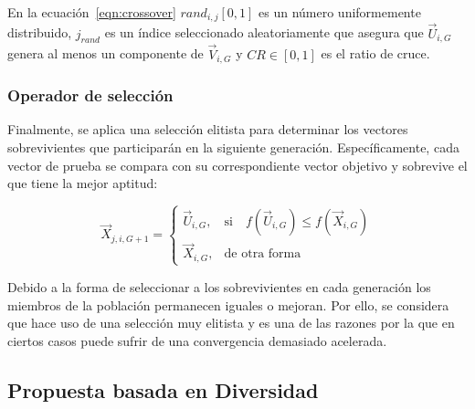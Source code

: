 En la ecuación~\ref{eqn:crossover} $rand_{i,j}[0,1]$ es un número uniformemente distribuido, 
$j_{rand}$ es un índice seleccionado aleatoriamente que asegura que $\vec{U}_{i,G}$ genera al menos un componente 
de $\vec{V}_{i,G}$ y $CR \in [0,1]$ es el ratio de cruce.

\subsubsection{Operador de selección}
Finalmente, se aplica una selección elitista para determinar los vectores sobrevivientes que participarán en la siguiente generación.
%
Específicamente, cada vector de prueba se compara con su correspondiente vector objetivo y sobrevive el que tiene la mejor aptitud:

\begin{equation} \label{eqn:selection}
\vec{X}_{j,i,G+1}= 
\begin{cases}
    \vec{U}_{i,G},& \text{si} \quad f(\vec{U}_{i,G}) \leq f(\vec{X}_{i,G})  \\
    \vec{X}_{i,G},              & \text{de otra forma}
\end{cases}
\end{equation}

Debido a la forma de seleccionar a los sobrevivientes en cada generación los miembros de la población permanecen iguales o mejoran.
%
Por ello, se considera que \DE{} hace uso de una selección muy elitista y es una de las razones por la que en ciertos casos puede
sufrir de una convergencia demasiado acelerada.

\subsection{Propuesta basada en Diversidad}


